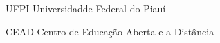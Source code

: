 \begin{siglas}
  \item[UFPI] Universidadde Federal do Piauí
  \item[CEAD] Centro de Educação Aberta e a Distância
\end{siglas}